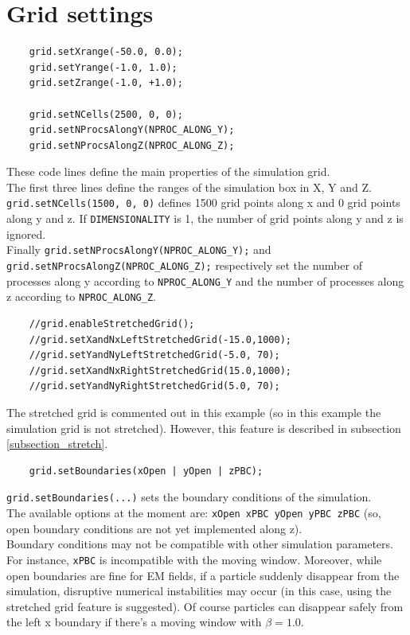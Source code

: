 \documentclass[11pt,a4paper]{report}
\begin{document}
\section{Grid settings}
\begin{lstlisting}
	grid.setXrange(-50.0, 0.0);
	grid.setYrange(-1.0, 1.0);
	grid.setZrange(-1.0, +1.0);

	grid.setNCells(2500, 0, 0);
	grid.setNProcsAlongY(NPROC_ALONG_Y);
	grid.setNProcsAlongZ(NPROC_ALONG_Z);
\end{lstlisting}
These code lines define the main properties of the simulation grid.\\
The first three lines define the ranges of the simulation box in X, Y and Z.\\
\verb+grid.setNCells(1500, 0, 0)+ defines 1500 grid points along x and 0 grid points along y and z. If \verb+DIMENSIONALITY+ is 1, the number of grid points along y and z is ignored.\\
Finally \verb+grid.setNProcsAlongY(NPROC_ALONG_Y);+ and \verb+grid.setNProcsAlongZ(NPROC_ALONG_Z);+ respectively set the number of processes along y according to \verb+NPROC_ALONG_Y+ and the number of processes along z according to \verb+NPROC_ALONG_Z+.
\begin{lstlisting}
	//grid.enableStretchedGrid();
	//grid.setXandNxLeftStretchedGrid(-15.0,1000);
	//grid.setYandNyLeftStretchedGrid(-5.0, 70);
	//grid.setXandNxRightStretchedGrid(15.0,1000);
	//grid.setYandNyRightStretchedGrid(5.0, 70);
\end{lstlisting}
The stretched grid is commented out in this example (so in this example the simulation grid is not stretched). However, this feature is described in subsection \ref{subsection_stretch}.
\begin{lstlisting}
	grid.setBoundaries(xOpen | yOpen | zPBC);
\end{lstlisting}
\verb+grid.setBoundaries(...)+ sets the boundary conditions of the simulation.\\ The available options at the moment are: \verb+xOpen xPBC yOpen yPBC zPBC+ 
(so, open boundary conditions are not yet implemented along z).\\
Boundary conditions may not be compatible with other simulation parameters. For instance, \verb+xPBC+ is incompatible with the moving window. Moreover, while open boundaries are fine for EM fields, if a particle suddenly disappear from the simulation, disruptive numerical instabilities may occur (in this case, using the stretched grid feature is suggested). Of course particles can disappear safely from the left x boundary if there's a moving window with $\beta = 1.0$. \\
\end{document}
